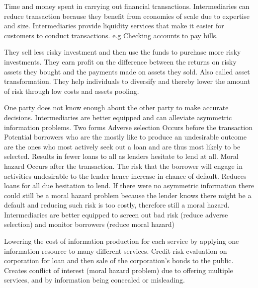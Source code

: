 \documentclass[12pt]{examnotes}
\begin{document}
\ra Time and money spent in carrying out financial transactions.  
\ra Intermediaries can reduce transaction because they benefit from economies of scale due to expertise and size. 
\ra Intermediaries provide liquidity services that make it easier for customers to conduct transactions. e.g Checking accounts to pay bills.

\ra They sell less risky investment and then use the funds to purchase more risky investments. 
\ra They earn profit on the difference between the returns on risky assets they bought and the payments made on assets they sold. Also called asset transformation. 
\ra They help individuals to diversify and thereby lower the amount of risk through low costs and assets pooling.

\ra One party does not know enough about the other party to make accurate decisions.
\ra Intermediaries are better equipped and can alleviate asymmetric information problems. 
\ra Two forms
 Adverse selection
\rna Occurs before the transaction
\rna Potential borrowers who are the mostly like to produce an undesirable outcome are the ones who most actively seek out a loan and are thus most likely to be selected. 
\rna Results in fewer loans to all as lenders hesitate to lend at all.
 Moral hazard
\rna Occurs after the transaction. 
\rna The risk that the borrower will engage in activities undesirable to the lender hence increase in chance of default. 
\rna Reduces loans for all due hesitation to lend.
\rna If there were no asymmetric information there could still be a moral hazard problem because the lender knows there might be a default and reducing such risk is too costly, therefore still a moral hazard.
\ra Intermediaries are better equipped to screen out bad risk (reduce adverse selection) and monitor borrowers (reduce moral hazard)

\ra Lowering the cost of information production for each service by applying one information resource to many different services.
\ra Credit risk evaluation on corporation for loan and then sale of the corporation's bonds to the public.
\ra Creates conflict of interest (moral hazard problem) due to offering multiple services, and by information being concealed or misleading.
\end{document}
